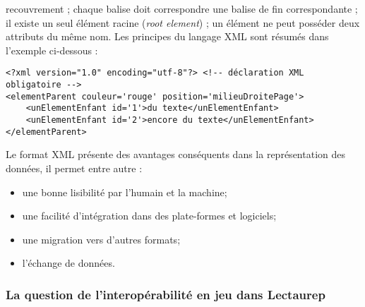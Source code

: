 recouvrement ; chaque balise doit correspondre une balise de fin correspondante ; il existe un seul élément racine (\textit{root element}) ; un élément ne peut posséder deux attributs du même nom. Les principes du langage XML sont résumés dans l'exemple ci-dessous : 
\lstset{language=XML}
\begin{lstlisting}
<?xml version="1.0" encoding="utf-8"?> <!-- déclaration XML obligatoire -->
<elementParent couleur='rouge' position='milieuDroitePage'>
    <unElementEnfant id='1'>du texte</unElementEnfant>
    <unElementEnfant id='2'>encore du texte</unElementEnfant>
</elementParent>
\end{lstlisting}
Le format XML présente des avantages conséquents dans la représentation des données, il permet entre autre :
\begin{itemize}
    \item une bonne lisibilité par l'humain et la machine;
    \item une facilité d'intégration dans des plate-formes et logiciels;
    \item une migration vers d'autres formats;
    \item l'échange de données.
\end{itemize}

\subsubsection{La question de l'interopérabilité en jeu dans Lectaurep}

